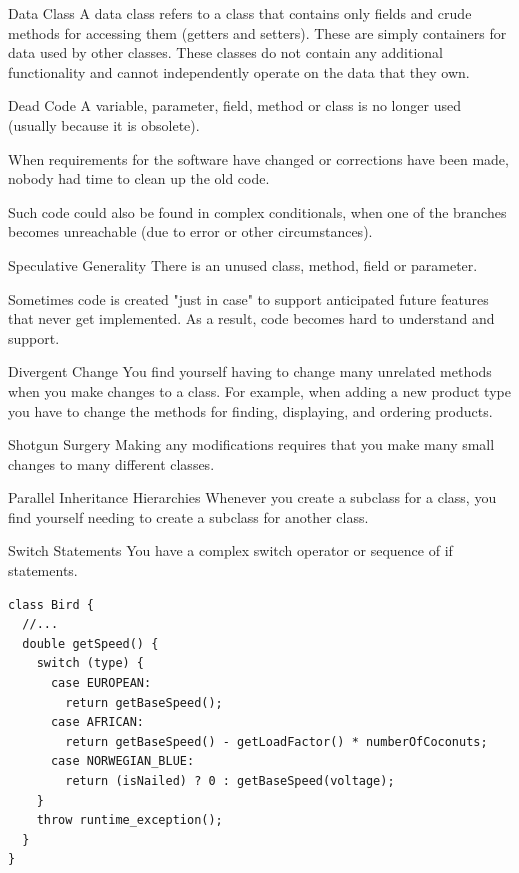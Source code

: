 \documentclass{beamer}
\begin{document}
\begin{frame}{Data Class}
A data class refers to a class that contains only fields and crude methods for
accessing them (getters and setters). These are simply containers for data used
by other classes. These classes do not contain any additional functionality and
cannot independently operate on the data that they own.  
\end{frame}

\begin{frame}{Dead Code}
A variable, parameter, field, method or class is no longer used (usually because
it is obsolete).

When requirements for the software have changed or corrections have been made,
nobody had time to clean up the old code. 

Such code could also be found in complex conditionals, when one of the branches
becomes unreachable (due to error or other circumstances). 
\end{frame}

\begin{frame}{Speculative Generality}
There is an unused class, method, field or parameter.

Sometimes code is created "just in case" to support anticipated future features
that never get implemented. As a result, code becomes hard to understand and
support.  
\end{frame}

\begin{frame}{Divergent Change}
You find yourself having to change many unrelated methods when you make changes
to a class. For example, when adding a new product type you have to change the
methods for finding, displaying, and ordering products. 
\end{frame}

\begin{frame}{Shotgun Surgery}
Making any modifications requires that you make many small changes to many
different classes.
\end{frame}

\begin{frame}{Parallel Inheritance Hierarchies}
Whenever you create a subclass for a class, you find yourself needing to create
a subclass for another class.
\end{frame}

\begin{frame}[fragile]{Switch Statements}
You have a complex switch operator or sequence of if statements.

\begin{lstlisting}
class Bird {
  //...
  double getSpeed() {
    switch (type) {
      case EUROPEAN:
        return getBaseSpeed();
      case AFRICAN:
        return getBaseSpeed() - getLoadFactor() * numberOfCoconuts;
      case NORWEGIAN_BLUE:
        return (isNailed) ? 0 : getBaseSpeed(voltage);
    }
    throw runtime_exception();
  }
}
\end{lstlisting}
\end{frame}
\end{document}
